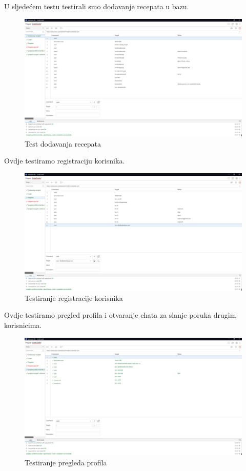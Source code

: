 			U sljedećem testu testirali smo dodavanje recepata u bazu.
			
			\begin{figure}[H]
				\includegraphics[scale= 0.25]{slike/test2.png}
				\centering
				\caption{Test dodavanja recepata}
				\label{fig:Test2}
			\end{figure}
			
			Ovdje testiramo registraciju korisnika.
			
			\begin{figure}[H]
				\includegraphics[scale= 0.25]{slike/test3.png}
				\centering
				\caption{Testiranje registracije korisnika}
				\label{fig:Test3}
			\end{figure}
			
			Ovdje testiramo pregled profila i otvaranje chata za slanje poruka drugim korisnicima.
			
			\begin{figure}[H]
				\includegraphics[scale= 0.25]{slike/test4.png}
				\centering
				\caption{Testiranje pregleda profila}
				\label{fig:Test4}
			\end{figure}
			
